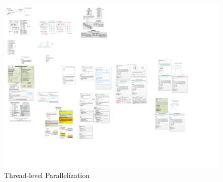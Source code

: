 \begin{figure}[htp]
\begin{center}
\includegraphics[width=1.0\linewidth]{chap6fig/naturalSplit2.pdf}
\caption{Thread-level Parallelization 
\label{fig:threadP}}
\end{center}
\end{figure}


